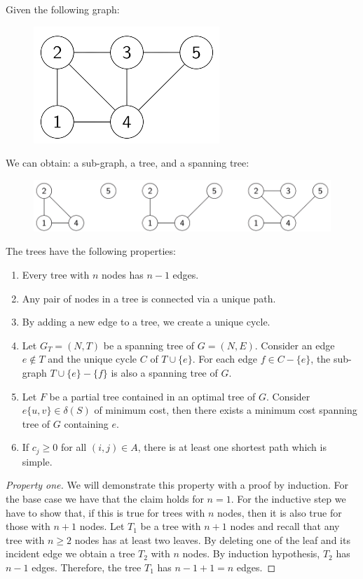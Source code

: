 \documentclass[12pt, a4paper]{report}
\newtheorem[style=M,bodystyle=\normalfont]{theorem}{Theorem}
\newtheorem[style=M,bodystyle=\normalfont]{corollary}{Corollary}
\newtheorem[style=M,bodystyle=\normalfont]{lemma}{Lemma}
\newtheorem[style=M,bodystyle=\normalfont]{definition}{Definition}
\begin{document}
    \begin{example}
        Given the following graph: 
        \begin{figure}[H]
            \centering
            \includegraphics[width=0.3\linewidth]{images/sgraph.png}
        \end{figure}
        We can obtain: a sub-graph, a tree, and a spanning tree: 
        \begin{figure}[H]
            \centering
            \includegraphics[width=0.8\linewidth]{images/sgraphmod.png}
        \end{figure}
    \end{example}
    The trees have the following properties: 
    \begin{enumerate}
        \item Every tree with $n$ nodes has $n-1$ edges. 
        \item Any pair of nodes in a tree is connected via a unique path. 
        \item By adding a new edge to a tree, we create a unique cycle. 
        \item Let $G_T=(N,T)$ be a spanning tree of $G=(N,E)$. Consider an edge $e \notin T$ and the unique cycle $C$ of $T \cup \{e\}$. For each edge $f \in C-\{e\}$, the 
            sub-graph $T\cup \{e\}-\{f\}$ is also a spanning tree of $G$. 
        \item Let $F$ be a partial tree contained in an optimal tree of $G$. Consider $e\{u,v\}\in \delta(S)$ of minimum cost, then there exists a minimum cost spanning tree of 
            $G$ containing $e$. 
        \item If $c_j \geq 0$ for all $(i,j) \in A$, there is at least one shortest path which is simple. 
    \end{enumerate}
    \begin{proof}[Property one]
        We will demonstrate this property with a proof by induction. For the base case we have that the claim holds for $n=1$. 
        For the inductive step we have to show that, if this is true for trees with $n$ nodes, then it is also true for those with $n+1$ nodes. 
        Let $T_1$ be a tree with $n+1$ nodes and recall that any tree with $n \geq 2$ nodes has at least two leaves. By deleting one of the leaf and its incident edge we obtain
        a tree $T_2$ with $n$ nodes. By induction hypothesis, $T_2$ has $n-1$ edges. Therefore, the tree $T_1$ has $n-1+1=n$ edges. 
    \end{proof}
\end{document}
